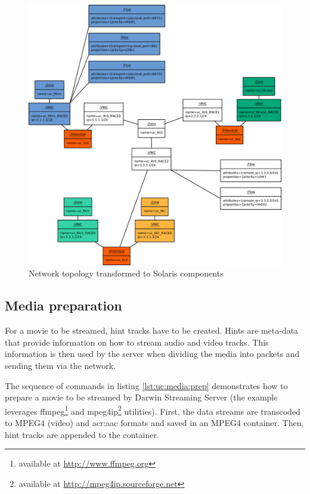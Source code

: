 \documentclass[11pt]{book}
\begin{document}
        \begin{figure}[H]
          \centering
          \includegraphics[width=.9\textwidth]{img/test-case/topology-xbow.pdf}

          \caption{Network topology transformed to Solaris components}
          \label{fig:cs:topo-xbow}
        \end{figure}


      \subsection{Media preparation}
      \label{sub:}

        For a movie to be streamed, hint tracks have to be created. Hints are meta-data that provide information on how
        to stream audio and video tracks. This information is then used by the server when dividing the media into
        packets and sending them via the network.

        The sequence of commands in listing \ref{lst:uc:media:prep} demonstrates how to prepare a movie to be streamed
        by Darwin Streaming Server (the example leverages ffmpeg\footnote{available at \url{http://www.ffmpeg.org}} and
        mpeg4ip\footnote{available at \url{http://mpeg4ip.sourceforge.net}} utilities). First, the data streams are
        transcoded to MPEG4 (video) and \gls{acr:aac} formats and saved in an MPEG4 container. Then, hint tracks are
        appended to the container. \\
\end{document}
